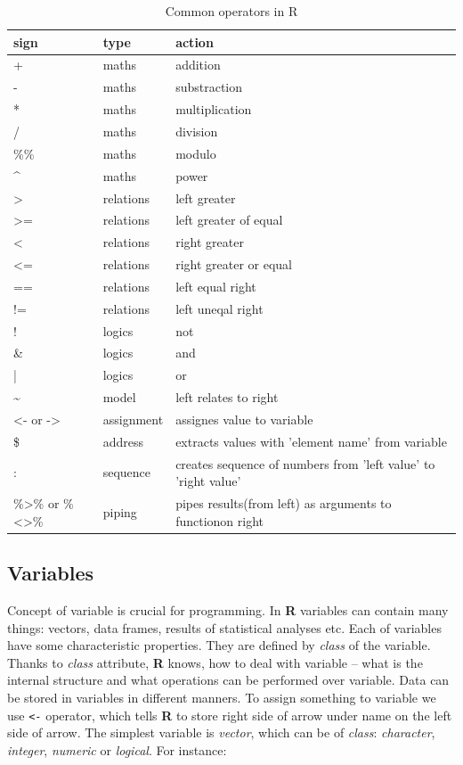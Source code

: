 \documentclass[]{book}
\theoremstyle{definition}
\theoremstyle{definition}
\theoremstyle{definition}
\theoremstyle{remark}
\begin{document}
\begin{longtable}[t]{lll}
\caption{\label{tab:tab-operators}Common operators in R}\\
\toprule
sign & type & action\\
\midrule
+ & maths & addition\\
- & maths & substraction\\
* & maths & multiplication\\
/ & maths & division\\
\%\% & maths & modulo\\
\addlinespace
\textasciicircum{} & maths & power\\
> & relations & left greater\\
>= & relations & left greater of equal\\
< & relations & right greater\\
<= & relations & right greater or equal\\
\addlinespace
== & relations & left equal right\\
!= & relations & left uneqal right\\
! & logics & not\\
\& & logics & and\\
| & logics & or\\
\addlinespace
\textasciitilde{} & model & left relates to right\\
<- or -> & assignment & assignes value to variable\\
\$ & address & extracts values with 'element name' from variable\\
: & sequence & creates sequence of numbers from 'left value' to 'right value'\\
\%>\% or \%<>\% & piping & pipes results(from left) as arguments to functionon right\\
\bottomrule
\end{longtable}

\subsection{Variables}\label{variables}

Concept of variable is crucial for programming. In \textbf{R} variables
can contain many things: vectors, data frames, results of statistical
analyses etc. Each of variables have some characteristic properties.
They are defined by \emph{class} of the variable. Thanks to \emph{class}
attribute, \textbf{R} knows, how to deal with variable -- what is the
internal structure and what operations can be performed over variable.
Data can be stored in variables in different manners. To assign
something to variable we use \texttt{\textless{}-} operator, which tells
\textbf{R} to store right side of arrow under name on the left side of
arrow. The simplest variable is \emph{vector}, which can be of
\emph{class}: \emph{character}, \emph{integer}, \emph{numeric} or
\emph{logical}. For instance:
\end{document}
